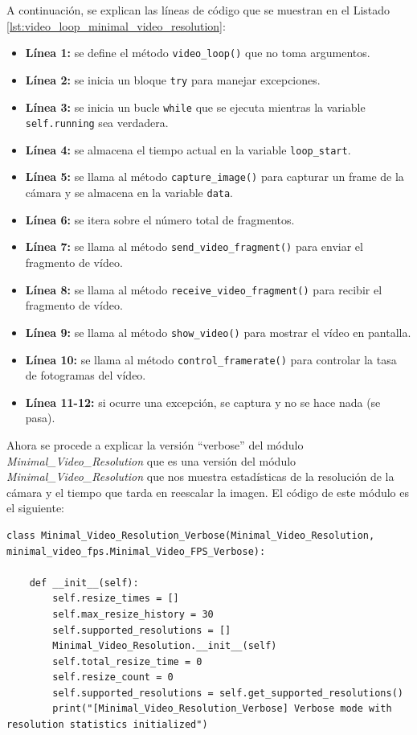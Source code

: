 A continuación, se explican las líneas de código que se muestran en el Listado \ref{lst:video_loop_minimal_video_resolution}:
\begin{itemize}
    \item \textbf{Línea 1:} se define el método \texttt{video\_loop()} que no toma argumentos.
    \item \textbf{Línea 2:} se inicia un bloque \texttt{try} para manejar excepciones.
    \item \textbf{Línea 3:} se inicia un bucle \texttt{while} que se ejecuta mientras la variable \texttt{self.running} sea verdadera.
    \item \textbf{Línea 4:} se almacena el tiempo actual en la variable \texttt{loop\_start}.
    \item \textbf{Línea 5:} se llama al método \texttt{capture\_image()} para capturar un frame de la cámara y se almacena en la variable \texttt{data}.
    \item \textbf{Línea 6:} se itera sobre el número total de fragmentos.
    \item \textbf{Línea 7:} se llama al método \texttt{send\_video\_fragment()} para enviar el fragmento de vídeo.
    \item \textbf{Línea 8:} se llama al método \texttt{receive\_video\_fragment()} para recibir el fragmento de vídeo.
    \item \textbf{Línea 9:} se llama al método \texttt{show\_video()} para mostrar el vídeo en pantalla.
    \item \textbf{Línea 10:} se llama al método \texttt{control\_framerate()} para controlar la tasa de fotogramas del vídeo.
    \item \textbf{Línea 11-12:} si ocurre una excepción, se captura y no se hace nada (se pasa).
\end{itemize}
\vspace{\baselineskip}

Ahora se procede a explicar la versión ``verbose'' del módulo \textit{Minimal\_Video\_Resolution} que es una versión del módulo \textit{Minimal\_Video\_Resolution} que nos muestra estadísticas de la resolución de la cámara y el tiempo que tarda en reescalar la imagen. El código de este módulo es el siguiente:
\begin{lstlisting}[style=pythonstyle, caption={Comienzo del módulo \textit{Minimal\_Video\_Resolution\_verbose} y su inicialización.}, label={lst:comienzo_minimal_video_resolution_verbose}]
class Minimal_Video_Resolution_Verbose(Minimal_Video_Resolution, minimal_video_fps.Minimal_Video_FPS_Verbose):
    
    def __init__(self):
        self.resize_times = []
        self.max_resize_history = 30
        self.supported_resolutions = []
        Minimal_Video_Resolution.__init__(self)
        self.total_resize_time = 0
        self.resize_count = 0
        self.supported_resolutions = self.get_supported_resolutions()
        print("[Minimal_Video_Resolution_Verbose] Verbose mode with resolution statistics initialized")
\end{lstlisting}
\vspace{\baselineskip}


